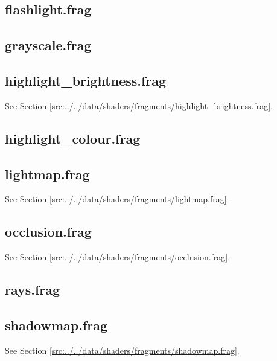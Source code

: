 \documentclass[../main/main.tex]{subfiles}
\begin{document}
\subsection{flashlight.frag}

\label{src:data/shaders/fragments/flashlight.frag}

\subsection{grayscale.frag}

\label{src:data/shaders/fragments/grayscale.frag}

\subsection{highlight\_brightness.frag}
See Section \ref{src:../../data/shaders/fragments/highlight_brightness.frag}.

\subsection{highlight\_colour.frag}

\label{src:data/shaders/fragments/highlight_colour.frag}

\subsection{lightmap.frag}
See Section \ref{src:../../data/shaders/fragments/lightmap.frag}.

\subsection{occlusion.frag}
See Section \ref{src:../../data/shaders/fragments/occlusion.frag}.

\subsection{rays.frag}

\label{src:data/shaders/fragments/rays.frag}

\subsection{shadowmap.frag}
See Section \ref{src:../../data/shaders/fragments/shadowmap.frag}.
\end{document}
